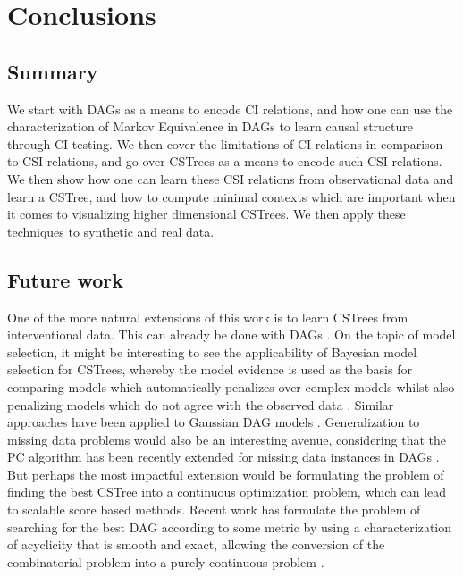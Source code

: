 \documentclass{tufte-book}
\begin{document}
\chapter{Conclusions}
\label{sec:orgc131cdb}
\section{Summary}
\label{sec:orgf168632}
We start with DAGs as a means to encode CI relations, and how one can use the characterization of Markov Equivalence in DAGs to learn causal structure through CI testing. We then cover the limitations of CI relations in comparison to CSI relations, and go over CSTrees as a means to encode such CSI relations. We then show how one can learn these CSI relations from observational data and learn a CSTree, and how to compute minimal contexts which are important when it comes to visualizing higher dimensional CSTrees. We then apply these techniques to synthetic and real data.


\section{Future work}
\label{sec:orgad22e50}
One of the more natural extensions of this work is to learn CSTrees from interventional data. This can already be done with DAGs \cite{yang-2018-charac-learn}. On the topic of model selection, it might be interesting to see the applicability of Bayesian model selection for CSTrees, whereby the model evidence is used as the basis for comparing models which automatically penalizes over-complex models whilst also penalizing models which do not agree with the observed data \cite{mackay-1992-bayes-inter}. Similar approaches have been applied to Gaussian DAG models \cite{castelletti-2020-bayes-model}. Generalization to missing data problems would also be an interesting avenue, considering that the PC algorithm has been recently extended for missing data instances in DAGs \cite{tu-2019-causal-discov}. But perhaps the most impactful extension would be formulating the problem of finding the best CSTree into a continuous optimization problem, which can lead to scalable score based methods. Recent work has formulate the problem of searching for the best DAG according to some metric by using a characterization of acyclicity that is smooth and exact, allowing the conversion of the combinatorial problem into a purely continuous problem \cite{zheng-2018-dags-no-tears}.  
\end{document}
